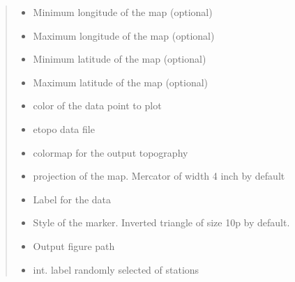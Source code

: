 \documentclass[letterpaper,10pt,english]{sphinxmanual}
\begin{document}
\begin{fulllineitems}
\begin{quote}
\begin{description}
\begin{itemize}
\item {} 
\sphinxAtStartPar
{} \textendash{} Minimum longitude of the map (optional)

\item {} 
\sphinxAtStartPar
{} \textendash{} Maximum longitude of the map (optional)

\item {} 
\sphinxAtStartPar
{} \textendash{} Minimum latitude of the map (optional)

\item {} 
\sphinxAtStartPar
{} \textendash{} Maximum latitude of the map (optional)

\item {} 
\sphinxAtStartPar
{} \textendash{} color of the data point to plot

\item {} 
\sphinxAtStartPar
{} \textendash{} etopo data file

\item {} 
\sphinxAtStartPar
{} \textendash{} colormap for the output topography

\item {} 
\sphinxAtStartPar
{} \textendash{} projection of the map. Mercator of width 4 inch by default

\item {} 
\sphinxAtStartPar
{} \textendash{} Label for the data

\item {} 
\sphinxAtStartPar
{} \textendash{} Style of the marker. Inverted triangle of size 10p by default.

\item {} 
\sphinxAtStartPar
{} \textendash{} Output figure path

\item {} 
\sphinxAtStartPar
{} \textendash{} int. label randomly selected  of stations

\end{itemize}


\end{description}
\end{quote}
\end{fulllineitems}
\end{document}
